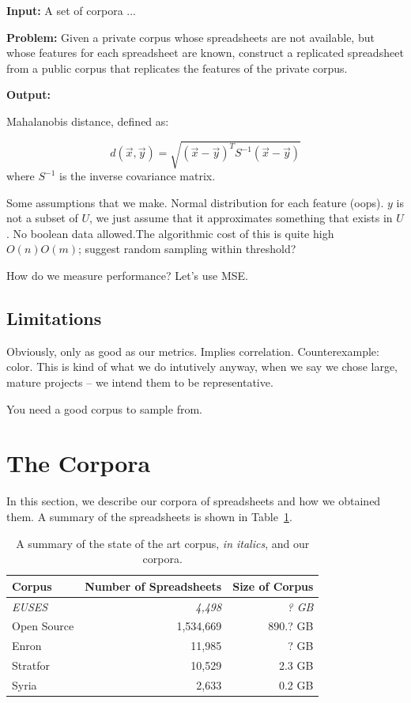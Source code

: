 \documentclass[conference]{IEEEtran}
\begin{document}
\textbf{Input:} A set of corpora ...

\textbf{Problem:} Given a private corpus whose spreadsheets are not available, but whose features for each spreadsheet are known, construct a replicated spreadsheet from a public corpus that replicates the features of the private corpus.

\textbf{Output:}


Mahalanobis distance, defined as:

\begin{equation}
d(\vec{x}, \vec{y}) = \sqrt{(\vec{x} - \vec{y})^TS^{-1}(\vec{x}-\vec{y})}
\end{equation}
where $S^{-1}$ is the inverse covariance matrix.

Some assumptions that we make. Normal distribution for each feature (oops). $y$ is not a subset of $U$, we just assume that it approximates something that exists in $U$. No boolean data allowed.The algorithmic cost of this is quite high $O(n)O(m)$; suggest random sampling within threshold?

How do we measure performance? Let's use MSE.

\subsection{Limitations}

Obviously, only as good as our metrics. Implies correlation. Counterexample: color.
This is kind of what we do intutively anyway, when we say we chose large, mature projects -- we intend them
to be representative.

You need a good corpus to sample from.

\section{The Corpora}

In this section, we describe our corpora of spreadsheets
and how we obtained them.
A summary of the spreadsheets is shown in Table~\ref{tab:corpusoverview}.

\begin{table}
	\caption{A summary of the state of the art corpus, \textit{in italics},
	and our corpora.}\label{tab:corpusoverview}
	\centering
	\begin{tabular}{lrr}
		\toprule
		\textbf{Corpus} & \textbf{Number of Spreadsheets} & \textbf{Size of Corpus}\\
		\midrule	  	
	  	\textit{EUSES~\cite{fisher2005euses}} & \textit{4,498} & \textit{? GB}\\	  	
	  	Open Source & 1,534,669 & 890.? GB \\
	  	Enron & 11,985 & ? GB \\ 
		Stratfor & 10,529 & 2.3 GB\\
		Syria & 2,633 & 0.2 GB\\
		\bottomrule
	\end{tabular}
\end{table}
\end{document}
